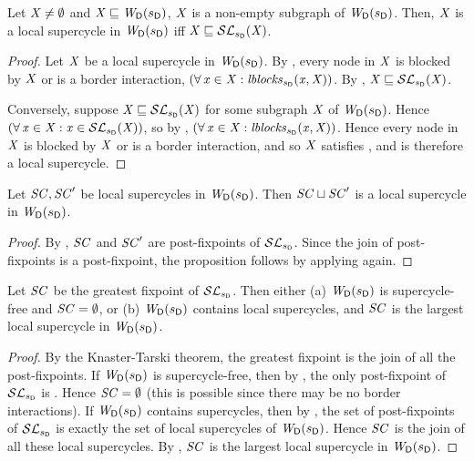 \begin{proposition} \label{prop:locGFP} \label{prop:supercycleGFPLoc}
Let $\XS \ne \ewfg$ and $\XS \subg \lwfg{B}{\sD}{\DS}$, \ie $\XS$ is a non-empty subgraph of $\lwfg{\B}{\sD}{\DS}$.
Then, $\XS$ is a local supercycle in $\lwfg{\B}{\sD}{\DS}$ iff $\XS \subg \lSFs{\sD}{\XS}$.
\end{proposition}
%
\begin{proof}
Let $\XS$ be a local supercycle in $\lwfg{B}{\sD}{\DS}$. By , every node in $\XS$ is blocked by $\XS$ or is a border interaction, \ie 
$(\fa \ndx \in \XS: \lblocks{\sD}{\ndx}{\XS})$. By , $\XS \subg \lSFs{\sD}{\XS}$.

Conversely, suppose $\XS \subg \lSFs{\sD}{\XS}$ for some subgraph $\XS$ of $\lwfg{B}{\sD}{\DS}$. Hence 
$(\fa \ndx \in \XS: \ndx \in \lSFs{\sD}{\XS})$, so by , $(\fa \ndx \in \XS: \lblocks{\sD}{\ndx}{\XS})$.
Hence every node in $\XS$ is blocked by $\XS$ or is a border interaction, and so $\XS$ satisfies , and is therefore a local supercycle.
\end{proof}

\begin{proposition} \label{prop:supercycleLoc:union}
Let $\SC, \SC'$ be local supercycles in $\lwfg{B}{\sD}{\DS}$. Then $\SC \join \SC'$ is a local supercycle in $\lwfg{B}{\sD}{\DS}$.
\end{proposition}
%
\begin{proof}
By , $\SC$ and $\SC'$ are post-fixpoints of $\lSFsymb_{\sD}$. Since the join of post-fixpoints is a post-fixpoint, 
the proposition follows by applying  again.
\end{proof}


\begin{proposition} \label{prop:GFPisLargestSCLoc}
Let $\SC$ be the greatest fixpoint of $\lSFsymb_{\sD}$. Then either
(a) $\lwfg{\B}{\sD}{\DS}$ is supercycle-free and $\SC = \ewfg$, or 
(b) $\lwfg{\B}{\sD}{\DS}$ contains local supercycles, and $\SC$ is the largest local supercycle in $\lwfg{\B}{\sD}{\DS}$.
\end{proposition}
%
\begin{proof}
By the Knaster-Tarski theorem, the greatest fixpoint is the join of all the post-fixpoints. 
If $\lwfg{B}{\sD}{\DS}$ is supercycle-free, then by , the only post-fixpoint of $\lSFsymb_{\sD}$ is \ewfg.
Hence $\SC = \ewfg$ (this is possible since there may be no border interactions). %
If $\lwfg{B}{\sD}{\DS}$ contains supercycles, then by ,  the set of post-fixpoints of $\lSFsymb_{\sD}$ is exactly the set of 
local supercycles of $\lwfg{B}{\sD}{\DS}$. Hence $\SC$ is the join of all these local supercycles. By , $\SC$ is the largest local supercycle in 
$\lwfg{\B}{\sD}{\DS}$.
\end{proof}



